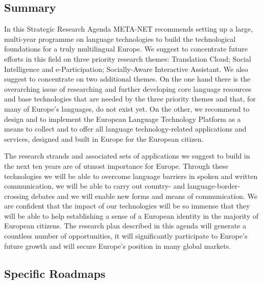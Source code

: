 \documentclass[10pt, plain]{../../metanetpaper}
\begin{document}
\clearpage

\label{sec:conclusions}

\begin{multicols}{2}

\subsection{Summary}
\label{sec:final-summary}

In this Strategic Research Agenda META-NET recommends setting up a large, multi-year programme on language technologies to build the technological foundations for a truly multilingual Europe. We suggest to concentrate future efforts in this field on three priority research themes: Translation Cloud; Social Intelligence and e-Participation; Socially-Aware Interactive Assistant. We also suggest to concentrate on two additional themes. On the one hand there is the overarching issue of researching and further developing core language resources and base technologies that are needed by the three priority themes and that, for many of Europe's languages, do not exist yet. On the other, we recommend to design and to implement the European Language Technology Platform as a means to collect and to offer all language technology-related applications and services, designed and built in Europe for the European citizen.

The research strands and associated sets of applications we suggest to build in the next ten years are of utmost importance for Europe. Through these technologies we will be able to overcome language barriers in spoken and written communication, we will be able to carry out country- and language-border-crossing debates and we will enable new forms and means of communication. We are confident that the impact of our technologies will be so immense that they will be able to help establishing a sense of a European identity in the majority of European citizens. The research plan described in this agenda will generate a countless number of opportunities, it will significantly participate to Europe's future growth and will secure Europe's position in many global markets.

\subsection{Specific Roadmaps}
\label{sec:roadmaps}


\end{multicols}
\end{document}
